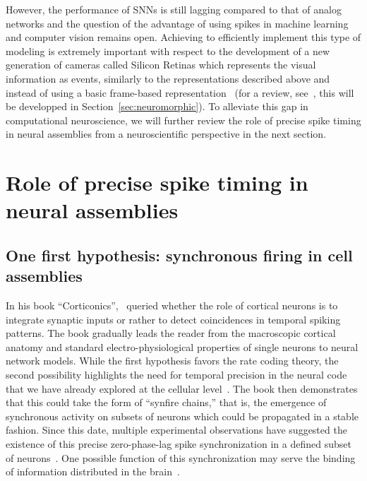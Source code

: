 \documentclass[brainsci, %
               review,submit,pdftex,moreauthors
               ]{Definitions/mdpi}
\begin{document}
However, the performance of SNNs is still lagging compared to that of analog networks and the question of the advantage of using spikes in machine learning and computer vision remains open. Achieving to efficiently implement this type of modeling is extremely important with respect to the development of a new generation of cameras called Silicon Retinas which represents the visual information as events, similarly to the representations described above and instead of using a basic frame-based representation~\citep{lichtsteiner_128-128_2008} (for a review, see~\citep{rasetto_challenges_2022}, this will be developped in Section~\ref{sec:neuromorphic}). %
To alleviate this gap in computational neuroscience, we will further review the role of  precise spike timing in neural assemblies from a neuroscientific perspective in the next section.
%
\section{Role of precise spike timing in neural assemblies}
\subsection{One first hypothesis: synchronous firing in cell assemblies}
%
In his book ``Corticonics'',~\citet{abeles_corticonics_1991} queried whether the role of cortical neurons is to integrate synaptic inputs or rather to detect coincidences in temporal spiking patterns. The book gradually leads the reader from the macroscopic cortical anatomy and standard electro-physiological properties of single neurons to neural network models. While the first hypothesis favors the rate coding theory, the second possibility highlights the need for temporal precision in the neural code that we have already explored at the cellular level~\citep{abeles_role_1982,paugam-moisy_computing_2012}. The book then demonstrates that this could take the form of ``synfire chains,'' that is, the emergence of synchronous activity on subsets of neurons which could be propagated in a stable fashion. Since this date, multiple experimental observations have suggested the existence of this precise zero-phase-lag spike synchronization in a defined subset of neurons~\citep{harris_organization_2003}. One possible function of this synchronization may serve the binding of information distributed in the brain~\citep{singer_visual_1995, roelfsema_visuomotor_1997}.
\end{document}
